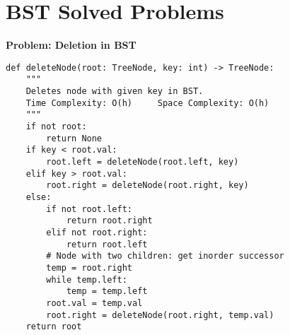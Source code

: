 % 
% 
\section*{BST Solved Problems }
\noindent\textbf{Problem: Deletion in BST}
\begin{verbatim}
def deleteNode(root: TreeNode, key: int) -> TreeNode:
    """
    Deletes node with given key in BST.
    Time Complexity: O(h)     Space Complexity: O(h)
    """
    if not root:
        return None
    if key < root.val:
        root.left = deleteNode(root.left, key)
    elif key > root.val:
        root.right = deleteNode(root.right, key)
    else:
        if not root.left:
            return root.right
        elif not root.right:
            return root.left
        # Node with two children: get inorder successor
        temp = root.right
        while temp.left:
            temp = temp.left
        root.val = temp.val
        root.right = deleteNode(root.right, temp.val)
    return root
\end{verbatim}


